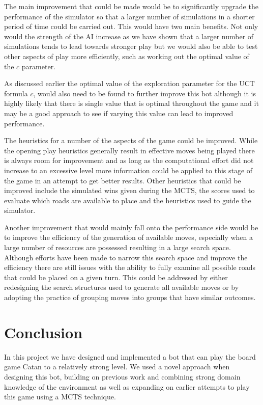 \documentclass[]{article}
\let\oldsection\section
\renewcommand\section{\clearpage\oldsection}
\begin{document}
\par The main improvement that could be made would be to significantly upgrade the performance of the simulator so that a larger number of simulations in a shorter period of time could be carried out. This would have two main benefits. Not only would the strength of the AI increase as we have shown that a larger number of simulations tends to lead towards stronger play but we would also be able to test other aspects of play more efficiently, such as working out the optimal value of the $c$ parameter.

\par As discussed earlier the optimal value of the exploration parameter for the UCT formula $c$, would also need to be found to further improve this bot although it is highly likely that there is single value that is optimal throughout the game and it may be a good approach to see if varying this value can lead to improved performance.

\par The heuristics for a number of the aspects of the game could be improved. While the opening play heuristics generally result in effective moves being played there is always room for improvement and as long as the computational effort did not increase to an excessive level more information could be applied to this stage of the game in an attempt to get better results. Other heuristics that could be improved include the simulated wins given during the MCTS, the scores used to evaluate which roads are available to place and the heuristics used to guide the simulator. 

\par Another improvement that would mainly fall onto the performance side would be to improve the efficiency of the generation of available moves, especially when a large number of resources are possessed resulting in a large search space. Although efforts have been made to narrow this search space and improve the efficiency there are still issues with the ability to fully examine all possible roads that could be placed on a given turn. This could be addressed by either redesigning the search structures used to generate all available moves or by adopting the practice of grouping moves into groups that have similar outcomes.

\section{Conclusion}
In this project we have designed and implemented a bot that can play the board game Catan to a relatively strong level. We used a novel approach when designing this bot, building on previous work and combining strong domain knowledge of the environment as well as expanding on earlier attempts to play this game using a MCTS technique.
\end{document}
